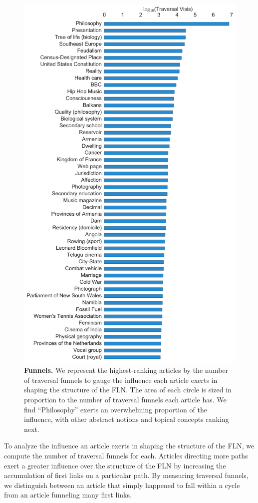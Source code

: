 \documentclass[pre,twocolumn,twoside,superscriptaddress,floatfix, aps, 10pt]{revtex4-1}
\begin{document}
\begin{figure}[tp!]
  \includegraphics[width=\columnwidth]{graphics/top_funnels.png}
  \caption{
    \textbf{Funnels.}
We represent the highest-ranking articles by the number of traversal 
funnels to gauge the influence each article exerts in shaping the 
structure of the FLN. 
The area of each circle is sized in proportion to the number of 
traversal funnels each article has. 
We find ``Philosophy'' exerts an overwhelming proportion
of the influence, with other abstract notions and topical concepts ranking
next.}
  \label{fig:Funnels}
\end{figure}
To analyze the influence an article exerts in shaping the 
structure of the FLN, we compute the number of traversal funnels for each.
Articles directing more paths exert a greater influence over the structure
of the FLN by increasing the accumulation of first links
on a particular path. By measuring traversal funnels, we distinguish between an article that simply happened to fall within a cycle from an article funneling 
many first links.
\end{document}

